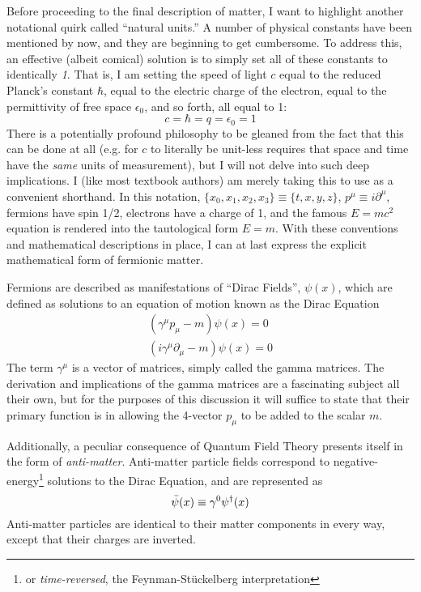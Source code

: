     Before proceeding to the final description of matter, I want to highlight another notational quirk called ``natural units.''
    A number of physical constants have been mentioned by now, and they are beginning to get cumbersome.
    To address this, an effective (albeit comical) solution is to simply set all of these constants to identically \textit{1}.
    That is, I am setting the speed of light $c$ equal to the reduced Planck's constant $\hbar$,
        equal to the electric charge of the electron, equal to the permittivity of free space $\epsilon_0$,
        and so forth, all equal to 1:
    \begin{equation} c=\hbar=q=\epsilon_0=1 \end{equation}
    There is a potentially profound philosophy to be gleaned from the fact that this can be done at all
        (e.g. for $c$ to literally be unit-less requires that space and time have the \textit{same} units of measurement),
        but I will not delve into such deep implications.
    I (like most textbook authors) am merely taking this to use as a convenient shorthand.
    In this notation, $\{x_0, x_1, x_2, x_3\} \equiv \{t,x,y,z\}$,
        $p^\mu \equiv i \partial^\mu$,
        fermions have spin 1/2,
        electrons have a charge of 1,
        and the famous $E=mc^2$ equation is rendered into the tautological form $E=m$.
    With these conventions and mathematical descriptions in place,
        I can at last express the explicit mathematical form of fermionic matter.

    Fermions are described as manifestations of ``Dirac Fields'', $\psi(x)$,
        which are defined as solutions to an equation of motion known as the Dirac Equation
    \begin{equation} \begin{split}
        (\gamma^\mu p_\mu - m) \psi(x) = 0
        \\ (i\gamma^\mu \partial_\mu - m) \psi(x) = 0
    \end{split} \end{equation}
    The term $\gamma^\mu$ is a vector of matrices, simply called the gamma matrices.
    The derivation and implications of the gamma matrices are a fascinating subject all their own, 
        but for the purposes of this discussion it will suffice to state that
        their primary function is in allowing the 4-vector $p_\mu$ to be added to the scalar $m$.

    Additionally, a peculiar consequence of Quantum Field Theory presents itself in the form of \textit{anti-matter}.
    Anti-matter particle fields correspond to negative-energy\footnote{
            or \textit{time-reversed}, the Feynman-St\"uckelberg interpretation
        } solutions to the Dirac Equation,
        and are represented as
    \begin{equation}
        \bar{\psi}(x) \equiv \gamma^0 \psi^\dag(x)
    \end{equation}
    Anti-matter particles are identical to their matter components in every way,
        except that their charges are inverted.

